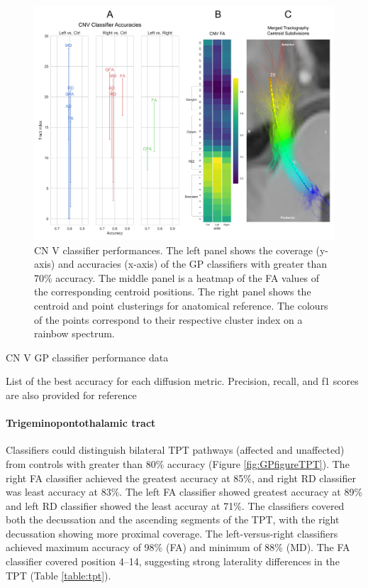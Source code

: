 \begin{figure}[ht]
\centering
\includegraphics[width=\linewidth]{figure-GP-CNV.pdf}
\caption{CN V classifier performances. The left panel shows the coverage (y-axis) and accuracies (x-axis) of the GP classifiers with greater than 70\% accuracy. The middle panel is a heatmap of the FA values of the corresponding centroid positions. The right panel shows the centroid and point clusterings for anatomical reference. The colours of the points correspond to their respective cluster index on a rainbow spectrum. }
\label{fig:GPfigure4}
\end{figure}

\begin{table}[ht]
\centering
{}
\caption{CN V GP classifier performance data}
\caption*{List of the best accuracy for each diffusion metric. Precision, recall, and f1 scores are also provided for reference}
\label{table:CN V}
\end{table}

\paragraph{Trigeminopontothalamic tract}
Classifiers could distinguish bilateral TPT pathways (affected and unaffected) from controls with greater than 80\% accuracy (Figure \ref{fig:GPfigureTPT}). The right FA classifier achieved the greatest accuracy at 85\%, and right RD classifier was least accuracy at 83\%. The left FA classifier showed greatest accuracy at 89\% and left RD classifier showed the least accuray at 71\%. The classifiers covered both the decussation and the ascending segments of the TPT, with the right decussation showing more proximal coverage. The left-versus-right classifiers achieved maximum accuracy of 98\% (FA) and minimum of 88\% (MD). The FA classifier covered position 4--14, suggesting strong laterality differences in the TPT (Table \ref{table:tpt}). 

